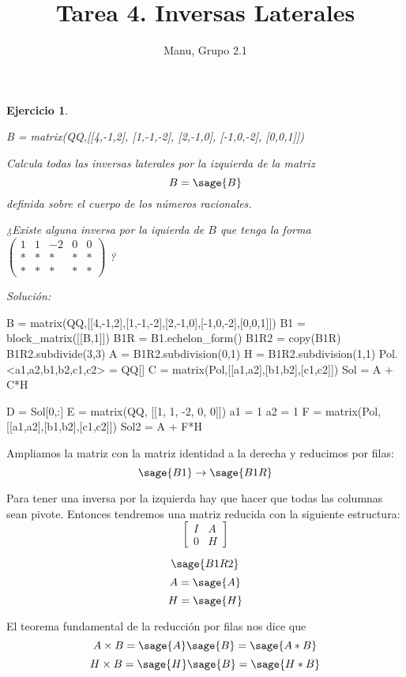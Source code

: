 \documentclass{amsart}
\title{Tarea 4. Inversas Laterales}
\author{Manu, Grupo 2.1}
\newtheorem{ejer}{Ejercicio}
\begin{document}
\maketitle

\begin{ejer}
\begin{sagecode}
B = matrix(QQ,[[4,-1,2],
[1,-1,-2],
[2,-1,0],
[-1,0,-2],
[0,0,1]])
\end{sagecode}

Calcula todas las inversas laterales por la izquierda de la matriz 
$$ B = \sage{B} $$
definida sobre el cuerpo de los números racionales. 

¿Existe alguna inversa por la iquierda de $B$ que tenga la forma
$\left(\begin{array}{rrrrr}
1 & 1 & -2 & 0 & 0 \\
* & * & * & * & * \\
* & * & * & * & *
\end{array}\right)$
?
\end{ejer}

{\it Solución: }

\begin{sageblock}
B = matrix(QQ,[[4,-1,2],[1,-1,-2],[2,-1,0],[-1,0,-2],[0,0,1]])
B1 = block_matrix([[B,1]])
B1R = B1.echelon_form()
B1R2 = copy(B1R)
B1R2.subdivide(3,3)
A = B1R2.subdivision(0,1)
H = B1R2.subdivision(1,1)
Pol.<a1,a2,b1,b2,c1,c2> = QQ[]
C = matrix(Pol,[[a1,a2],[b1,b2],[c1,c2]])
Sol = A + C*H

D = Sol[0,:]
E = matrix(QQ, [[1, 1, -2, 0, 0]])
a1 = 1
a2 = 1
F = matrix(Pol,[[a1,a2],[b1,b2],[c1,c2]])
Sol2 = A + F*H
\end{sageblock}

Ampliamos la matriz con la matriz identidad a la derecha y reducimos por filas:
$$ \sage{B1} \to \sage{B1R} $$

Para tener una inversa por la izquierda hay que hacer que todas las columnas sean pivote.
Entonces tendremos una matriz reducida con la siguiente estructura:
$$ \left[\begin{array}{c|c} I & A \\ \hline 0 & H \end{array}\right]$$

$$ \sage{B1R2} $$
$$ A = \sage{A} $$
$$ H = \sage{H} $$

El teorema fundamental de la reducción por filas nos dice que 
$$ A \times B = \sage{A} \sage{B} = \sage{A*B} $$
$$ H \times B = \sage{H} \sage{B} = \sage{H*B} $$
\end{document}
